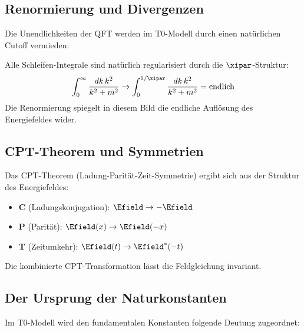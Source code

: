 	\subsection{Renormierung und Divergenzen}
	
	Die Unendlichkeiten der QFT werden im T0-Modell durch einen natürlichen Cutoff vermieden:
	
	\begin{quantum}
		Alle Schleifen-Integrale sind natürlich regularisiert durch die $\xipar$-Struktur:
		\begin{equation}
			\int_0^\infty \frac{dk \, k^2}{k^2 + m^2} \rightarrow \int_0^{1/\xipar} \frac{dk \, k^2}{k^2 + m^2} = \text{endlich}
		\end{equation}
		Die Renormierung spiegelt in diesem Bild die endliche Auflösung des Energiefeldes wider.
	\end{quantum}
	
	\subsection{CPT-Theorem und Symmetrien}
	
	Das CPT-Theorem (Ladung-Parität-Zeit-Symmetrie) ergibt sich aus der Struktur des Energiefeldes:
	
	\begin{itemize}
		\item \textbf{C} (Ladungskonjugation): $\Efield \rightarrow -\Efield$
		\item \textbf{P} (Parität): $\Efield(x) \rightarrow \Efield(-x)$
		\item \textbf{T} (Zeitumkehr): $\Efield(t) \rightarrow \Efield^*(-t)$
	\end{itemize}
	
	Die kombinierte CPT-Transformation lässt die Feldgleichung invariant.
	
	\subsection{Der Ursprung der Naturkonstanten}
	
	Im T0-Modell wird den fundamentalen Konstanten folgende Deutung zugeordnet:
	
